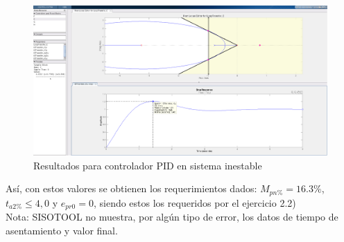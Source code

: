 \documentclass{report}
\begin{document}
\begin{figure}[h!]
    \centering  
    \includegraphics[width=1\textwidth]{P2_PID.png}
    \caption{Resultados para controlador PID en sistema inestable}
    \label{F:P2_PID}
\end{figure}

Así, con estos valores se obtienen los requerimientos dados: \(M_{pn\%} = 16.3\%\), \(t_{a2\%} \leqslant 4,0\) y \(e_{pr0}=0\), siendo estos los requeridos por el ejercicio 2.2)\\

Nota: SISOTOOL no muestra, por algún tipo de error, los datos de tiempo de asentamiento y valor final.
\end{document}
